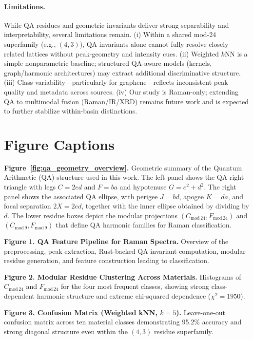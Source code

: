 \documentclass[12pt]{article}
\begin{document}
\paragraph{Limitations.}
While QA residues and geometric invariants deliver strong separability and interpretability, several
limitations remain. (i) Within a shared mod-24 superfamily (e.g., $(4,3)$), QA invariants alone cannot
fully resolve closely related lattices without peak-geometry and intensity cues. (ii) Weighted $k$NN is a
simple nonparametric baseline; structured QA-aware models (kernels, graph/harmonic architectures) may
extract additional discriminative structure. (iii) Class variability—particularly for graphene—reflects
inconsistent peak quality and metadata across sources. (iv) Our study is Raman-only; extending QA to
multimodal fusion (Raman/IR/XRD) remains future work and is expected to further stabilize within-basin
distinctions.

\section*{Figure Captions}

\noindent\textbf{Figure~\ref{fig:qa_geometry_overview}.}
Geometric summary of the Quantum Arithmetic (QA) structure used in this work. The left panel shows the QA
right triangle with legs $C = 2 e d$ and $F = b a$ and hypotenuse $G = e^{2} + d^{2}$. The right panel
shows the associated QA ellipse, with perigee $J = b d$, apogee $K = d a$, and focal separation
$2X = 2 e d$, together with the inner ellipse obtained by dividing by $d$. The lower residue boxes depict
the modular projections $(C_{\mathrm{mod}\,24},F_{\mathrm{mod}\,24})$ and $(C_{\mathrm{mod}\,9},F_{\mathrm{mod}\,9})$
that define QA harmonic families for Raman classification.

\noindent\textbf{Figure 1. QA Feature Pipeline for Raman Spectra.}
Overview of the preprocessing, peak extraction, Rust-backed QA invariant computation, modular residue
generation, and feature construction leading to classification.

\noindent\textbf{Figure 2. Modular Residue Clustering Across Materials.}
Histograms of $C_{\mathrm{mod}\,24}$ and $F_{\mathrm{mod}\,24}$ for the four most frequent classes,
showing strong class-dependent harmonic structure and extreme chi-squared dependence ($\chi^2 = 1950$).

\noindent\textbf{Figure 3. Confusion Matrix (Weighted kNN, $k=5$).}
Leave-one-out confusion matrix across ten material classes demonstrating 95.2\% accuracy and strong diagonal
structure even within the $(4,3)$ residue superfamily.
\end{document}
